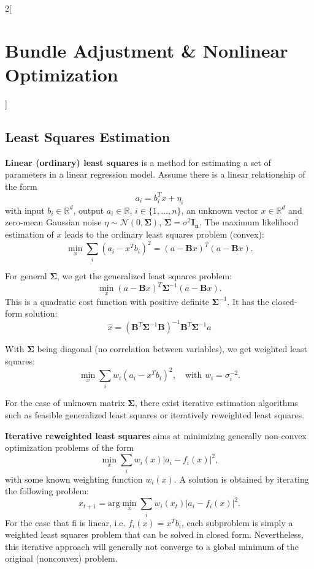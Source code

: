 \documentclass[oneside,fontsize=11pt,paper=a4]{scrartcl}
\begin{document}
\begin{multicols}{2}[\section{Bundle Adjustment \& Nonlinear Optimization}]
\subsection{Least Squares Estimation}
\textbf{Linear (ordinary) least squares} is a method for estimating a set of parameters in a linear regression model.
Assume there is a linear relationship of the form
\begin{equation*}
	a_i = b_i^T x + \eta_i
\end{equation*}
with input $b_i \in \mathbb{R}^d$, output $a_i \in \mathbb{R}$, $i \in \{1,\dots,n\}$, an unknown vector $x \in \mathbb{R}^d$ and zero-mean Gaussian noise $\eta \sim \mathcal{N}(0,\boldsymbol{\Sigma})$, $\boldsymbol{\Sigma} = \sigma^2 \boldsymbol{I_n}$.
The maximum likelihood estimation of $x$ leads to the ordinary least squares problem (convex):
\begin{equation*}
	\min_{x} \sum_{i} (a_i - x^T b_i)^2 = (a-\boldsymbol{B}x)^T (a - \boldsymbol{B}x).
\end{equation*}

For general $\boldsymbol{\Sigma}$, we get the generalized least squares problem:
\begin{equation*}
    \min_{x} (a-\boldsymbol{B}x)^T \boldsymbol{\Sigma}^{-1} (a - \boldsymbol{B}x).
\end{equation*}
This is a quadratic cost function with positive definite $\boldsymbol{\Sigma}^{-1}$.
It has the closed-form solution:
\begin{equation*}
    \hat{x} = (\boldsymbol{B}^T \boldsymbol{\Sigma}^{-1} \boldsymbol{B})^{-1} \boldsymbol{B}^T \boldsymbol{\Sigma}^{-1} a
\end{equation*}

With $\boldsymbol{\Sigma}$ being diagonal (no correlation between variables), we get weighted least squares:
\begin{equation*}
	\min_{x} \sum_{i} w_i (a_i - x^T b_i)^2, \quad \text{with } w_i = \sigma_i^{-2}.
\end{equation*}

For the case of unknown matrix $\boldsymbol{\Sigma}$, there exist iterative estimation algorithms such as feasible generalized least squares or iteratively reweighted least squares.\par

\textbf{Iterative reweighted least squares} aims at minimizing generally non-convex optimization problems of the form
\begin{equation*}
	\min_{x} \sum_i w_i(x) |a_i - f_i(x)|^2,
\end{equation*}
with some known weighting function $w_i(x)$.
A solution is obtained by iterating the following problem:
\begin{equation*}
	x_{t+1} = \text{arg}\min_{x} \sum_i w_i(x_t) |a_i - f_i(x)|^2.
\end{equation*}
For the case that fi is linear, i.e. $f_i(x) = x^T b_i$, each subproblem is simply a weighted least squares problem that can be solved in closed form.
Nevertheless, this iterative approach will generally not converge to a global minimum of the original (nonconvex) problem.\par


\end{multicols}
\end{document}
